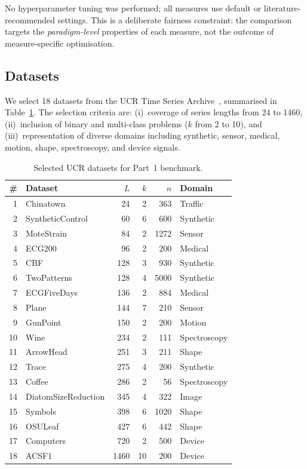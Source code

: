 No hyperparameter tuning was performed; all measures use default or literature-recommended settings.
This is a deliberate fairness constraint: the comparison targets the \emph{paradigm-level} properties of each measure, not the outcome of measure-specific optimisation.

\subsection{Datasets}\label{sec:method-datasets}

We select 18 datasets from the UCR Time Series Archive~\cite{bagnall2017bakeoff}, summarised in Table~\ref{tab:datasets}.
The selection criteria are: (i)~coverage of series lengths from 24 to 1460, (ii)~inclusion of binary and multi-class problems ($k$ from 2 to 10), and (iii)~representation of diverse domains including synthetic, sensor, medical, motion, shape, spectroscopy, and device signals.

\begin{table}[htbp]
\centering
\caption{Selected UCR datasets for Part~1 benchmark.}\label{tab:datasets}
\small
\begin{tabular}{rlrrrl}
\toprule
\# & Dataset & $L$ & $k$ & $n$ & Domain \\
\midrule
1  & Chinatown           &   24 &  2 &  363 & Traffic \\
2  & SyntheticControl    &   60 &  6 &  600 & Synthetic \\
3  & MoteStrain          &   84 &  2 & 1272 & Sensor \\
4  & ECG200              &   96 &  2 &  200 & Medical \\
5  & CBF                 &  128 &  3 &  930 & Synthetic \\
6  & TwoPatterns         &  128 &  4 & 5000 & Synthetic \\
7  & ECGFiveDays         &  136 &  2 &  884 & Medical \\
8  & Plane               &  144 &  7 &  210 & Sensor \\
9  & GunPoint            &  150 &  2 &  200 & Motion \\
10 & Wine                &  234 &  2 &  111 & Spectroscopy \\
11 & ArrowHead           &  251 &  3 &  211 & Shape \\
12 & Trace               &  275 &  4 &  200 & Synthetic \\
13 & Coffee              &  286 &  2 &   56 & Spectroscopy \\
14 & DiatomSizeReduction &  345 &  4 &  322 & Image \\
15 & Symbols             &  398 &  6 & 1020 & Shape \\
16 & OSULeaf             &  427 &  6 &  442 & Shape \\
17 & Computers           &  720 &  2 &  500 & Device \\
18 & ACSF1               & 1460 & 10 &  200 & Device \\
\bottomrule
\end{tabular}
\end{table}

